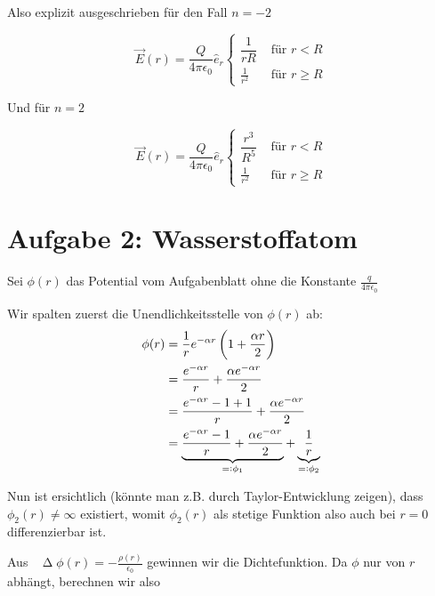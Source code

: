 \documentclass[a4paper,german,12pt,smallheadings]{scrartcl}
\begin{document}
\begin{enumerate}[a)]
    Also explizit ausgeschrieben für den Fall $n = -2$

    \begin{equation}
      \vec{E}(r) = \dfrac{Q}{4 \pi \epsilon_0} \hat{e}_r \begin{cases}
        \dfrac{1}{rR} & \text{ für } r < R \\
        \frac{1}{r^2} & \text{ für } r \ge R
      \end{cases}
    \end{equation}

    Und für $n = 2$

    \begin{equation}
      \vec{E}(r) = \dfrac{Q}{4 \pi \epsilon_0} \hat{e}_r \begin{cases}
        \dfrac{r^3}{R^5} & \text{ für } r < R \\
        \frac{1}{r^2} & \text{ für } r \ge R
      \end{cases}
    \end{equation}
\end{enumerate}

\section*{Aufgabe 2: Wasserstoffatom}
\newcommand*\laplace{\mathop{}\!\mathbin\Delta}

Sei $\phi(r)$ das Potential vom Aufgabenblatt ohne die Konstante $\frac{q}{4 \pi \epsilon_0}$

Wir spalten zuerst die Unendlichkeitsstelle von $\phi(r)$ ab:
\begin{align}
  \phi(r) &= \frac{1}{r} e^{-\alpha r} \del{1 + \frac{\alpha r}{2}} \\
          &= \frac{e^{-\alpha r}}{r} + \frac{\alpha e^{-\alpha r}}{2} \\
          &= \frac{e^{-\alpha r} - 1 + 1}{r} + \frac{\alpha e^{-\alpha r}}{2} \\
          &= \underbrace{\frac{e^{-\alpha r} - 1}{r} + \frac{\alpha e^{-\alpha r}}{2}}_{=: \phi_1} + \underbrace{\frac{1}{r}}_{=: \phi_2} \\
\end{align}

Nun ist ersichtlich (könnte man z.B. durch Taylor-Entwicklung zeigen), dass
$\phi_2(r) \neq \infty$ existiert, womit $\phi_2(r)$ als stetige Funktion also
auch bei $r = 0$ differenzierbar ist.

Aus $\laplace \phi(r) = -\frac{\rho(r)}{\epsilon_0}$ gewinnen wir die
Dichtefunktion. Da $\phi$ nur von $r$ abhängt, berechnen wir also
\end{document}
